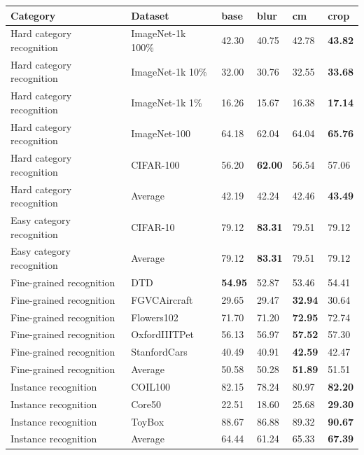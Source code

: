 \begin{tabular}{llllll}
\toprule
Category & Dataset & base & blur & cm & crop \\
\midrule
\midrule
Hard category recognition & ImageNet-1k 100\% & 42.30 & 40.75 & 42.78 & \textbf{43.82} \\
Hard category recognition & ImageNet-1k 10\% & 32.00 & 30.76 & 32.55 & \textbf{33.68} \\
Hard category recognition & ImageNet-1k 1\% & 16.26 & 15.67 & 16.38 & \textbf{17.14} \\
Hard category recognition & ImageNet-100 & 64.18 & 62.04 & 64.04 & \textbf{65.76} \\
Hard category recognition & CIFAR-100 & 56.20 & \textbf{62.00} & 56.54 & 57.06 \\
Hard category recognition & Average & 42.19 & 42.24 & 42.46 & \textbf{43.49} \\
\midrule
Easy category recognition & CIFAR-10 & 79.12 & \textbf{83.31} & 79.51 & 79.12 \\
Easy category recognition & Average & 79.12 & \textbf{83.31} & 79.51 & 79.12 \\
\midrule
Fine-grained recognition & DTD & \textbf{54.95} & 52.87 & 53.46 & 54.41 \\
Fine-grained recognition & FGVCAircraft & 29.65 & 29.47 & \textbf{32.94} & 30.64 \\
Fine-grained recognition & Flowers102 & 71.70 & 71.20 & \textbf{72.95} & 72.74 \\
Fine-grained recognition & OxfordIIITPet & 56.13 & 56.97 & \textbf{57.52} & 57.30 \\
Fine-grained recognition & StanfordCars & 40.49 & 40.91 & \textbf{42.59} & 42.47 \\
Fine-grained recognition & Average & 50.58 & 50.28 & \textbf{51.89} & 51.51 \\
\midrule
Instance recognition & COIL100 & 82.15 & 78.24 & 80.97 & \textbf{82.20} \\
Instance recognition & Core50 & 22.51 & 18.60 & 25.68 & \textbf{29.30} \\
Instance recognition & ToyBox & 88.67 & 86.88 & 89.32 & \textbf{90.67} \\
Instance recognition & Average & 64.44 & 61.24 & 65.33 & \textbf{67.39} \\
\bottomrule
\end{tabular}
